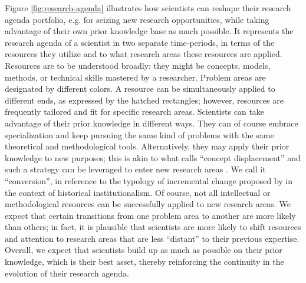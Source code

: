 \documentclass{article}
\begin{document}




Figure \ref{fig:research-agenda} illustrates how scientists can reshape their research agenda portfolio, e.g. for seizing new research opportunities, while taking advantage of their own prior knowledge base as much possible. It represents the research agenda of a scientist in two separate time-periods, in terms of the resources they utilize and to what research areas these resources are applied. Resources are to be understood broadly: they might be concepts, models, methods, or technical skills mastered by a researcher. Problem areas are designated by different colors. A resource can be simultaneously applied to different ends, as expressed by the hatched rectangles; however, resources are frequently tailored and fit for specific research areas. Scientists can take advantage of their prior knowledge in different ways. They can of course embrace specialization and keep pursuing the same kind of problems with the same theoretical and methodological tools.  Alternatively, they may apply their prior knowledge to new purposes; this is akin to what \citet{schon1963displacement} calls ``concept displacement'' and such a strategy can be leveraged to enter new research areas \citep{Mulkay1974}. We call it ``conversion'', in reference to the typology of incremental change proposed by \citet{mahoney_thelen_2009} in the context of historical institutionalism. Of course, not all intellectual or methodological resources can be successfully applied to new research areas. We expect that certain transitions from one problem area to another are more likely than others; in fact, it is plausible that scientists are more likely to shift resources and attention to research areas that are less ``distant'' to their previous expertise. Overall, we expect that scientists build up as much as possible on their prior knowledge, which is their best asset, thereby reinforcing the continuity in the evolution of their research agenda.
\end{document}
